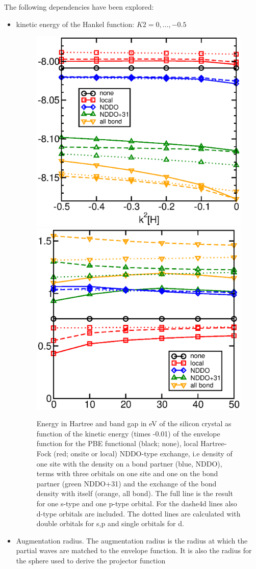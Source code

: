 \documentclass[11pt,a4paper]{report}
\begin{document}
The following dependencies have been explored:
\begin{itemize}
%
\item kinetic energy of the Hankel function: $K2=0,\ldots,-0.5$
\begin{figure}[h!]
\begin{center}
\includegraphics[width=0.4\linewidth,clip=true]{Figs/Eofk2si/eofk2.eps}
\includegraphics[width=0.4\linewidth,clip=true]{Figs/Gapofk2si/gapofk2.eps}
\end{center}
\caption{Energy in Hartree and band gap in eV of the silicon crystal
  as function of the kinetic energy (times -0.01) of the envelope
  function for the PBE functional (black; none), local Hartree-Fock
  (red; onsite or local) NDDO-type exchange, i.e density of one site
  with the density on a bond partner (blue, NDDO), terms with three
  orbitals on one site and one on the bond partner (green NDDO+31) and
  the exchange of the bond density with itself (orange, all bond).
  The full line is the result for one s-type and one p-type
  orbital. For the dashe4d lines also d-type orbitals are
  included. The dotted lines are calculated with double orbitals for
  s,p and single orbitals for d.}
\end{figure}
%
\item Augmentation radius. The augmentation radius is the radius at
  which the partial waves are matched to the envelope function. It is
  also the radius for the sphere used to derive the projector function

\end{itemize}
\end{document}
